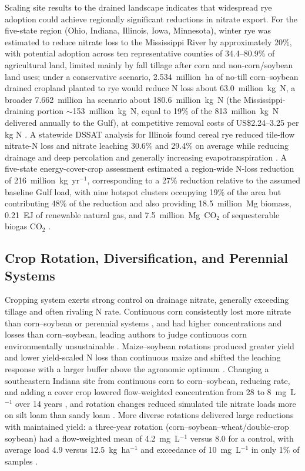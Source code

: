 Scaling site results to the drained landscape indicates that widespread rye adoption could achieve regionally significant reductions in nitrate export. For the five-state region (Ohio, Indiana, Illinois, Iowa, Minnesota), winter rye was estimated to reduce nitrate loss to the Mississippi River by approximately 20\%, with potential adoption across ten representative counties of 34.4--80.9\% of agricultural land, limited mainly by fall tillage after corn and non-corn/soybean land uses; under a conservative scenario, 2.534~million~ha of no-till corn--soybean drained cropland planted to rye would reduce N loss about 63.0~million~kg~N, a broader 7.662~million~ha scenario about 180.6~million~kg~N (the Mississippi-draining portion $\sim$153~million~kg~N, equal to 19\% of the 813~million~kg~N delivered annually to the Gulf), at competitive removal costs of US\$2.24--3.25 per kg N \parencite{Kladivko2014}. A statewide DSSAT analysis for Illinois found cereal rye reduced tile-flow nitrate-N loss and nitrate leaching 30.6\% and 29.4\% on average while reducing drainage and deep percolation and generally increasing evapotranspiration \parencite{Gupta2023b}. A five-state energy-cover-crop assessment estimated a region-wide N-loss reduction of 216~million~kg~yr$^{-1}$, corresponding to a 27\% reduction relative to the assumed baseline Gulf load, with nine hotspot clusters occupying 19\% of the area but contributing 48\% of the reduction and also providing 18.5~million~Mg biomass, 0.21~EJ of renewable natural gas, and 7.5~million~Mg~CO$_2$ of sequesterable biogas CO$_2$ \parencite{Malone2023}.

\subsection{Crop Rotation, Diversification, and Perennial Systems}

Cropping system exerts strong control on drainage nitrate, generally exceeding tillage and often rivaling N rate. Continuous corn consistently lost more nitrate than corn--soybean or perennial systems \parencite{Weed1996}, and had higher concentrations and losses than corn--soybean, leading authors to judge continuous corn environmentally unsustainable \parencite{Kanwar1997}. Maize--soybean rotations produced greater yield and lower yield-scaled N loss than continuous maize \parencite{Zhao2016} and shifted the leaching response with a larger buffer above the agronomic optimum \parencite{Pasley2021}. Changing a southeastern Indiana site from continuous corn to corn--soybean, reducing rate, and adding a cover crop lowered flow-weighted concentration from 28 to 8~mg~L$^{-1}$ over 14 years \parencite{Ritter2015}, and rotation changes reduced simulated tile nitrate loads more on silt loam than sandy loam \parencite{Ahmed2007b}. More diverse rotations delivered large reductions with maintained yield: a three-year rotation (corn--soybean--wheat/double-crop soybean) had a flow-weighted mean of 4.2~mg~L$^{-1}$ versus 8.0 for a control, with average load 4.9 versus 12.5~kg~ha$^{-1}$ and exceedance of 10~mg~L$^{-1}$ in only 1\% of samples \parencite{Gentry2025}.

